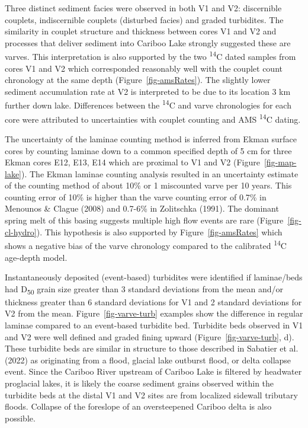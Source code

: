 \documentclass[
  letterpaper,
  DIV=11,
  numbers=noendperiod]{scrartcl}
\begin{document}
Three distinct sediment facies were observed in both V1 and V2:
discernible couplets, indiscernible couplets (disturbed facies) and
graded turbidites. The similarity in couplet structure and thickness
between cores V1 and V2 and processes that deliver sediment into Cariboo
Lake strongly suggested these are varves. This interpretation is also
supported by the two \textsuperscript{14}C dated samples from cores V1
and V2 which corresponded reasonably well with the couplet count
chronology at the same depth (Figure~\ref{fig-amsRates}). The slightly
lower sediment accumulation rate at V2 is interpreted to be due to its
location 3 km further down lake. Differences between the
\textsuperscript{14}C and varve chronologies for each core were
attributed to uncertainties with couplet counting and AMS
\textsuperscript{14}C dating.

The uncertainty of the laminae counting method is inferred from Ekman
surface cores by counting laminae down to a common specified depth of 5
cm for three Ekman cores E12, E13, E14 which are proximal to V1 and V2
(Figure~\ref{fig-map-lake}). The Ekman laminae counting analysis
resulted in an uncertainty estimate of the counting method of about 10\%
or 1 miscounted varve per 10 years. This counting error of 10\% is
higher than the varve counting error of 0.7\% in Menounos \& Clague
(2008) and 0.7-6\% in Zolitschka (1991). The dominant spring melt of
this basing suggests multiple high flow events are rare
(Figure~\ref{fig-cl-hydro}). This hypothesis is also supported by
Figure~\ref{fig-amsRates} which shows a negative bias of the varve
chronology compared to the calibrated \textsuperscript{14}C age-depth
model.

Instantaneously deposited (event-based) turbidites were identified if
laminae/beds had D\textsubscript{50} grain size greater than 3 standard
deviations from the mean and/or thickness greater than 6 standard
deviations for V1 and 2 standard deviations for V2 from the mean.
Figure~\ref{fig-varve-turb} examples show the difference in regular
laminae compared to an event-based turbidite bed. Turbidite beds
observed in V1 and V2 were well defined and graded fining upward
(Figure~\ref{fig-varve-turb}, d). These turbidite beds are similar in
structure to those described in Sabatier et al. (2022) as originating
from a flood, glacial lake outburst flood, or delta collapse event.
Since the Cariboo River upstream of Cariboo Lake is filtered by
headwater proglacial lakes, it is likely the coarse sediment grains
observed within the turbidite beds at the distal V1 and V2 sites are
from localized sidewall tributary floods. Collapse of the foreslope of
an oversteepened Cariboo delta is also possible.
\end{document}
